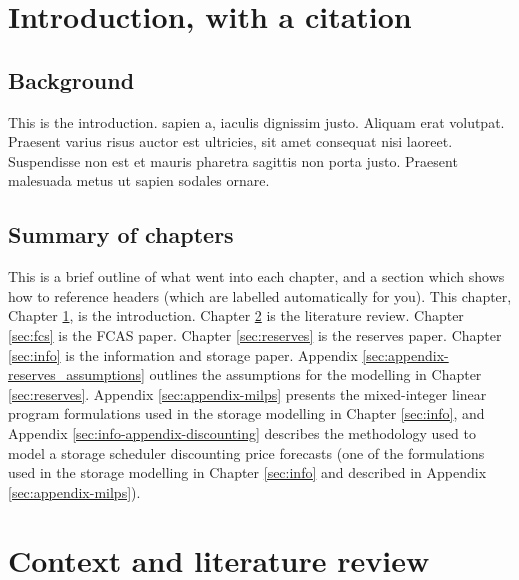 \documentclass[12pt,a4paper,]{report}
\begin{document}
\newpage

\setcounter{page}{1}
\doublespacing
\setlength{\parindent}{0.5in}

\hypertarget{sec:intro}{%
\chapter{Introduction, with a citation}\label{sec:intro}}

\hypertarget{background}{%
\section{Background}\label{background}}

This is the introduction. sapien a, iaculis dignissim justo. Aliquam
erat volutpat. Praesent varius risus auctor est ultricies, sit amet
consequat nisi laoreet. Suspendisse non est et mauris pharetra sagittis
non porta justo. Praesent malesuada metus ut sapien sodales ornare.

\hypertarget{summary-of-chapters}{%
\section{Summary of chapters}\label{summary-of-chapters}}

This is a brief outline of what went into each chapter, and a section
which shows how to reference headers (which are labelled automatically
for you). This chapter, Chapter \ref{sec:intro}, is the introduction.
Chapter \ref{sec:lit_review} is the literature review. Chapter
\ref{sec:fcs} is the FCAS paper. Chapter \ref{sec:reserves} is the
reserves paper. Chapter \ref{sec:info} is the information and storage
paper. Appendix \ref{sec:appendix-reserves_assumptions} outlines the
assumptions for the modelling in Chapter \ref{sec:reserves}. Appendix
\ref{sec:appendix-milps} presents the mixed-integer linear program
formulations used in the storage modelling in Chapter \ref{sec:info},
and Appendix \ref{sec:info-appendix-discounting} describes the
methodology used to model a storage scheduler discounting price
forecasts (one of the formulations used in the storage modelling in
Chapter \ref{sec:info} and described in Appendix
\ref{sec:appendix-milps}).

\hypertarget{sec:lit_review}{%
\chapter{Context and literature review}\label{sec:lit_review}}
\end{document}
